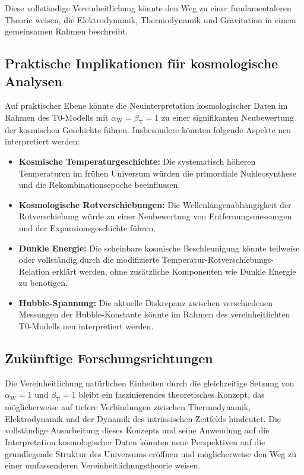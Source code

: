 \documentclass[12pt,a4paper]{article}
\newcommand{\betaT}{\beta_{\text{T}}}
\newcommand{\alphaW}{\alpha_{\text{W}}}
\begin{document}
	Diese vollständige Vereinheitlichung könnte den Weg zu einer fundamentaleren Theorie weisen, die Elektrodynamik, Thermodynamik und Gravitation in einem gemeinsamen Rahmen beschreibt.
	
	\subsection{Praktische Implikationen für kosmologische Analysen}
	
	Auf praktischer Ebene könnte die Neuinterpretation kosmologischer Daten im Rahmen des T0-Modells mit \(\alphaW = \betaT = 1\) zu einer signifikanten Neubewertung der kosmischen Geschichte führen. Insbesondere könnten folgende Aspekte neu interpretiert werden:
	
	\begin{itemize}
		\item \textbf{Kosmische Temperaturgeschichte:} Die systematisch höheren Temperaturen im frühen Universum würden die primordiale Nukleosynthese und die Rekombinationsepoche beeinflussen.
		\item \textbf{Kosmologische Rotverschiebungen:} Die Wellenlängenabhängigkeit der Rotverschiebung würde zu einer Neubewertung von Entfernungsmessungen und der Expansionsgeschichte führen.
		\item \textbf{Dunkle Energie:} Die scheinbare kosmische Beschleunigung könnte teilweise oder vollständig durch die modifizierte Temperatur-Rotverschiebungs-Relation erklärt werden, ohne zusätzliche Komponenten wie Dunkle Energie zu benötigen.
		\item \textbf{Hubble-Spannung:} Die aktuelle Diskrepanz zwischen verschiedenen Messungen der Hubble-Konstante könnte im Rahmen des vereinheitlichten T0-Modells neu interpretiert werden.
	\end{itemize}
	
	\subsection{Zukünftige Forschungsrichtungen}
	
	Die Vereinheitlichung natürlichen Einheiten durch die gleichzeitige Setzung von \(\alphaW = 1\) und \(\betaT = 1\) bleibt ein faszinierendes theoretisches Konzept, das möglicherweise auf tiefere Verbindungen zwischen Thermodynamik, Elektrodynamik und der Dynamik des intrinsischen Zeitfelds hindeutet. Die vollständige Ausarbeitung dieses Konzepts und seine Anwendung auf die Interpretation kosmologischer Daten könnten neue Perspektiven auf die grundlegende Struktur des Universums eröffnen und möglicherweise den Weg zu einer umfassenderen Vereinheitlichungstheorie weisen.
	
\end{document}
